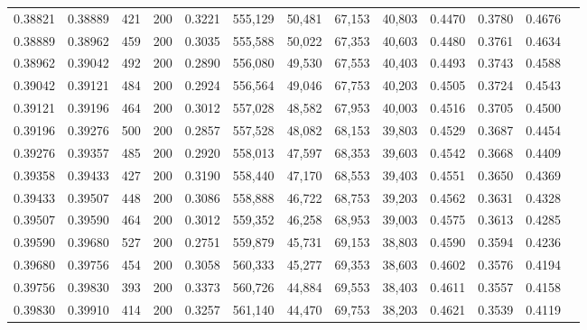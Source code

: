 \begin{tabular}{rrrrrrrrrrrrr}
0.38821 & 0.38889 &    421 & 200 &                                     0.3221 & 555,129 &  50,481 &  67,153 &  40,803 & 0.4470 & 0.3780 & 0.4676 \\
0.38889 & 0.38962 &    459 & 200 &                                     0.3035 & 555,588 &  50,022 &  67,353 &  40,603 & 0.4480 & 0.3761 & 0.4634 \\
0.38962 & 0.39042 &    492 & 200 &                                     0.2890 & 556,080 &  49,530 &  67,553 &  40,403 & 0.4493 & 0.3743 & 0.4588 \\
0.39042 & 0.39121 &    484 & 200 &                                     0.2924 & 556,564 &  49,046 &  67,753 &  40,203 & 0.4505 & 0.3724 & 0.4543 \\
0.39121 & 0.39196 &    464 & 200 &                                     0.3012 & 557,028 &  48,582 &  67,953 &  40,003 & 0.4516 & 0.3705 & 0.4500 \\
0.39196 & 0.39276 &    500 & 200 &                                     0.2857 & 557,528 &  48,082 &  68,153 &  39,803 & 0.4529 & 0.3687 & 0.4454 \\
0.39276 & 0.39357 &    485 & 200 &                                     0.2920 & 558,013 &  47,597 &  68,353 &  39,603 & 0.4542 & 0.3668 & 0.4409 \\
0.39358 & 0.39433 &    427 & 200 &                                     0.3190 & 558,440 &  47,170 &  68,553 &  39,403 & 0.4551 & 0.3650 & 0.4369 \\
0.39433 & 0.39507 &    448 & 200 &                                     0.3086 & 558,888 &  46,722 &  68,753 &  39,203 & 0.4562 & 0.3631 & 0.4328 \\
0.39507 & 0.39590 &    464 & 200 &                                     0.3012 & 559,352 &  46,258 &  68,953 &  39,003 & 0.4575 & 0.3613 & 0.4285 \\
0.39590 & 0.39680 &    527 & 200 &                                     0.2751 & 559,879 &  45,731 &  69,153 &  38,803 & 0.4590 & 0.3594 & 0.4236 \\
0.39680 & 0.39756 &    454 & 200 &                                     0.3058 & 560,333 &  45,277 &  69,353 &  38,603 & 0.4602 & 0.3576 & 0.4194 \\
0.39756 & 0.39830 &    393 & 200 &                                     0.3373 & 560,726 &  44,884 &  69,553 &  38,403 & 0.4611 & 0.3557 & 0.4158 \\
0.39830 & 0.39910 &    414 & 200 &                                     0.3257 & 561,140 &  44,470 &  69,753 &  38,203 & 0.4621 & 0.3539 & 0.4119 \\

\end{tabular}
